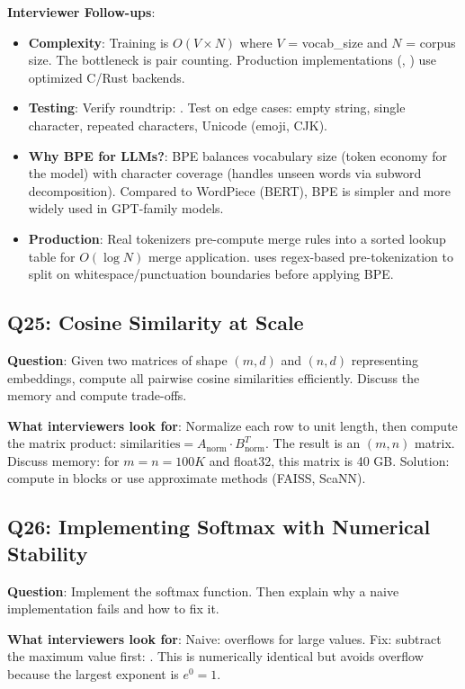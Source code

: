 \textbf{Interviewer Follow-ups}:
\begin{itemize}[leftmargin=*]
    \item \textbf{Complexity}: Training is $O(V \times N)$ where $V$ = vocab\_size and $N$ = corpus size. The bottleneck is pair counting. Production implementations (, ) use optimized C/Rust backends.
    \item \textbf{Testing}: Verify roundtrip: . Test on edge cases: empty string, single character, repeated characters, Unicode (emoji, CJK).
    \item \textbf{Why BPE for LLMs?}: BPE balances vocabulary size (token economy for the model) with character coverage (handles unseen words via subword decomposition). Compared to WordPiece (BERT), BPE is simpler and more widely used in GPT-family models.
    \item \textbf{Production}: Real tokenizers pre-compute merge rules into a sorted lookup table for $O(\log N)$ merge application.  uses regex-based pre-tokenization to split on whitespace/punctuation boundaries before applying BPE.
\end{itemize}

\subsection{Q25: Cosine Similarity at Scale}

\textbf{Question}: Given two matrices of shape $(m, d)$ and $(n, d)$ representing embeddings, compute all pairwise cosine similarities efficiently. Discuss the memory and compute trade-offs.

\textbf{What interviewers look for}: Normalize each row to unit length, then compute the matrix product: $\text{similarities} = A_{\text{norm}} \cdot B_{\text{norm}}^T$. The result is an $(m, n)$ matrix. Discuss memory: for $m = n = 100K$ and float32, this matrix is 40 GB. Solution: compute in blocks or use approximate methods (FAISS, ScaNN).

\subsection{Q26: Implementing Softmax with Numerical Stability}

\textbf{Question}: Implement the softmax function. Then explain why a naive implementation fails and how to fix it.

\textbf{What interviewers look for}: Naive:  overflows for large values. Fix: subtract the maximum value first: . This is numerically identical but avoids overflow because the largest exponent is $e^0 = 1$.

